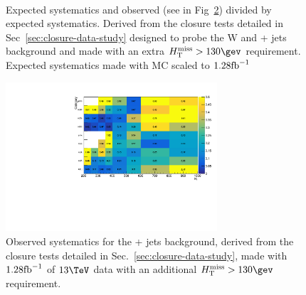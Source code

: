 \begin{figure}[]
  \centering
   ~~
  \caption{\label{fig:systematicsExp} Expected systematics and observed
  (see in Fig~\ref{fig:systematicsObs})
  divided by expected systematics. Derived from the closure tests 
  detailed in Sec~\ref{sec:closure-data-study} designed to probe the
  W and \ttbar + jets background and made with an extra
  $\mht>130\gev$ requirement. Expected systematics made with MC
  scaled to $1.28\text{fb}^{-1}$}
\end{figure}

\begin{figure}[]
  \centering
  \includegraphics[width=0.7\textwidth]{figures/closureTests/1280pb/Zinv/Zinv_systOut_obs.pdf}
  \caption{\label{fig:systematicsObs} Observed systematics for the
  \znunu + jets background, derived from
  the closure tests detailed in Sec.~\ref{sec:closure-data-study},
  made with $1.28\text{fb}^{-1}$ of $13\tev$ data with an additional
  $\mht>130\gev$ requirement.}
\end{figure}

